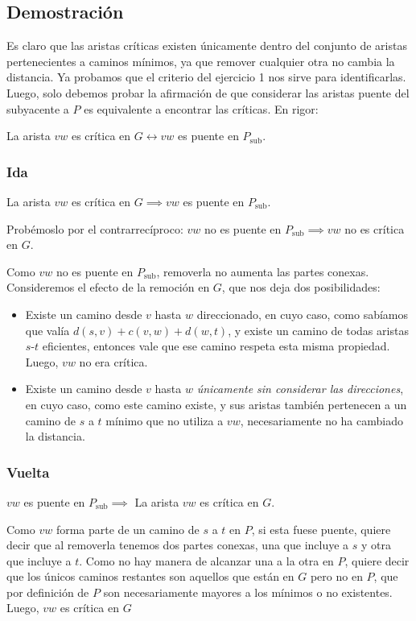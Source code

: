\documentclass{article}
\begin{document}
\subsection*{Demostración}

Es claro que las aristas críticas existen únicamente dentro del conjunto de aristas pertenecientes a caminos mínimos, ya que remover cualquier otra no cambia la distancia. Ya probamos que el criterio del ejercicio 1 nos sirve para identificarlas. Luego, solo debemos probar la afirmación de que considerar las aristas puente del subyacente a \( P \) es equivalente a encontrar las críticas. En rigor:

La arista \( vw \) es crítica en \( G \leftrightarrow vw \) es puente en \( P_{\text{sub}} \).

\subsubsection*{Ida}

La arista \( vw \) es crítica en \( G \implies vw \) es puente en \( P_{\text{sub}} \).

Probémoslo por el contrarrecíproco: \( vw \) no es puente en \( P_{\text{sub}} \implies vw \) no es crítica en \( G \).

Como \( vw \) no es puente en \( P_{\text{sub}} \), removerla no aumenta las partes conexas. Consideremos el efecto de la remoción en \( G \), que nos deja dos posibilidades:

\begin{itemize}
  \item Existe un camino desde \( v \) hasta \( w \) direccionado, en cuyo caso, como sabíamos que valía \( d(s,v) + c(v,w) + d(w,t) \), y existe un camino de todas aristas \( s \)-\( t \) eficientes, entonces vale que ese camino respeta esta misma propiedad. Luego, \( vw \) no era crítica.
  
  \item Existe un camino desde \( v \) hasta \( w \) \textit{únicamente sin considerar las direcciones}, en cuyo caso, como este camino existe, y sus aristas también pertenecen a un camino de \( s \) a \( t \) mínimo que no utiliza a \(vw\), necesariamente no ha cambiado la distancia.
\end{itemize}

\subsubsection*{Vuelta}

\( vw \) es puente en \( P_{\text{sub}} \implies \) La arista \( vw \) es crítica en \( G \).

Como \( vw \) forma parte de un camino de \( s \) a \( t \) en \( P \), si esta fuese puente, quiere decir que al removerla tenemos dos partes conexas, una que incluye a \( s \) y otra que incluye a \( t \). Como no hay manera de alcanzar una a la otra en \( P \), quiere decir que los únicos caminos restantes son aquellos que están en \( G \) pero no en \( P \), que por definición de \( P \) son necesariamente mayores a los mínimos o no existentes. Luego, \( vw \) es crítica en \( G \)
\end{document}
